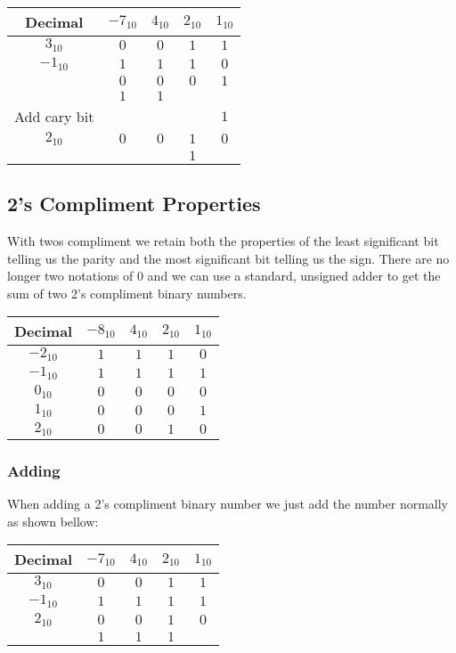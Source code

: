 \documentclass{article}
\begin{document}
\begin{center}
  \begin{tabular}{c | c | c | c | c }
    Decimal & $-7_{10}$ & $4_{10}$ & $2_{10}$ & $1_{10}$\\ \hline
    $3_{10}$ & $0$ & $0$ & $1$ & $1$\\
    $-1_{10}$ & $1$ & $1$ & $1$ & $0$\\ \hline
    & $0$ &  $0$ & $0$ & $1$\\
	& $1$ & $1$ &\\ \hline
	Add cary bit & & & &  $1$ \\
	$2_{10}$ & $0$ & $0$ & $1$ & $0$ \\ \hline
	& & & $1$ &\\
  \end{tabular}
\end{center}

\subsection{2's Compliment Properties}
With twos compliment we retain both the properties of the least significant bit telling us the parity
and the most significant bit telling us the sign. There are no longer two notations of $0$ and 
we can use a standard, unsigned adder to get the sum of two 2's compliment binary numbers.

\begin{center}
  \begin{tabular}{ | c | c | c | c | c | }
    \hline
    Decimal & $-8_{10}$ & $4_{10}$ & $2_{10}$ & $1_{10}$\\ \hline
    $-2_{10}$ & $1$ & $1$ & $1$ & $0$\\ \hline
    $-1_{10}$ & $1$ & $1$ & $1$ & $1$\\ \hline
    $0_{10}$ & $0$ &  $0$ & $0$ & $0$\\ \hline
    $1_{10}$ & $0$ & $0$ & $0$ & $1$\\ \hline
    $2_{10}$ & $0$ & $0$ & $1$ & $0$ \\
    \hline
  \end{tabular}
\end{center}

\subsubsection{Adding}
When adding a 2's compliment binary number we just add the number normally as shown bellow:

\begin{center}
  \begin{tabular}{c | c | c | c | c }
    Decimal & $-7_{10}$ & $4_{10}$ & $2_{10}$ & $1_{10}$\\ \hline
    $3_{10}$ & $0$ & $0$ & $1$ & $1$\\
    $-1_{10}$ & $1$ & $1$ & $1$ & $1$\\ \hline
    $2_{10}$& $0$ &  $0$ & $1$ & $0$\\
	& $1$ & $1$ & $1$\\
  \end{tabular}
\end{center}
\end{document}
